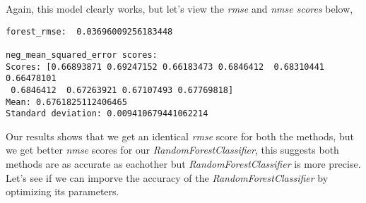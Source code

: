 \documentclass[8pt]{article}
\begin{document}
\newline
\newline
Again, this model clearly works, but let's view the \textit{rmse} and \textit{nmse scores} below,
\newline
\newline
\begin{adjustbox}{max width=\textwidth}
\begin{lstlisting}
forest_rmse:  0.03696009256183448

neg_mean_squared_error scores:
Scores: [0.66893871 0.69247152 0.66183473 0.6846412  0.68310441 0.66478101
 0.6846412  0.67263921 0.67107493 0.67769818]
Mean: 0.6761825112406465
Standard deviation: 0.009410679441062214
\end{lstlisting}
\end{adjustbox}
\newline
\newline
Our results shows that we get an identical \textit{rmse} score for both the methods, but we get better \textit{nmse} scores for our \textit{RandomForestClassifier}, this suggests both methods are as accurate as eachother but \textit{RandomForestClassifier} is more precise. Let's see if we can imporve the accuracy of the \textit{RandomForestClassifier} by optimizing its parameters.
\end{document}
